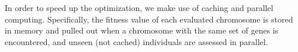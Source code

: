 In order to speed up the optimization, we make use of caching and parallel computing.
Specifically, the fitness value of each evaluated chromosome is stored in memory and pulled out when a chromosome with the same set of genes is encountered, and unseen (not cached) individuals are assessed in parallel.
